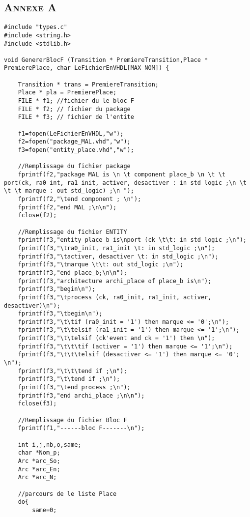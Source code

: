 \begin{appendices}
\chapter*{\textsc{Annexe A}}
	
	\begin{lstlisting}	
#include "types.c"
#include <string.h>
#include <stdlib.h>

void GenererBlocF (Transition * PremiereTransition,Place * PremierePlace, char LeFichierEnVHDL[MAX_NOM]) {

	Transition * trans = PremiereTransition;
   	Place * pla = PremierePlace;
	FILE * f1; //fichier du le bloc F
	FILE * f2; // fichier du package
	FILE * f3; // fichier de l'entite
	
	f1=fopen(LeFichierEnVHDL,"w");
	f2=fopen("package_MAL.vhd","w");
	f3=fopen("entity_place.vhd","w");
	
	//Remplissage du fichier package	
	fprintf(f2,"package MAL is \n \t component place_b \n \t \t port(ck, ra0_int, ra1_init, activer, desactiver : in std_logic ;\n \t \t \t marque : out std_logic) ;\n ");
	fprintf(f2,"\tend component ; \n");
	fprintf(f2,"end MAL ;\n\n");
	fclose(f2);
		
	//Remplissage du fichier ENTITY
	fprintf(f3,"entity place_b is\nport (ck \t\t: in std_logic ;\n");
	fprintf(f3,"\tra0_init, ra1_init \t: in std_logic ;\n");
	fprintf(f3,"\tactiver, desactiver \t: in std_logic ;\n");
	fprintf(f3,"\tmarque \t\t: out std_logic ;\n");
	fprintf(f3,"end place_b;\n\n");
	fprintf(f3,"architecture archi_place of place_b is\n");
	fprintf(f3,"begin\n");
	fprintf(f3,"\tprocess (ck, ra0_init, ra1_init, activer, desactiver)\n");
	fprintf(f3,"\tbegin\n");
	fprintf(f3,"\t\tif (ra0_init = '1') then marque <= '0';\n");
	fprintf(f3,"\t\telsif (ra1_init = '1') then marque <= '1';\n");
	fprintf(f3,"\t\telsif (ck'event and ck = '1') then \n");
	fprintf(f3,"\t\t\tif (activer = '1') then marque <= '1';\n");
	fprintf(f3,"\t\t\telsif (desactiver <= '1') then marque <= '0'; \n");
	fprintf(f3,"\t\t\tend if ;\n");
	fprintf(f3,"\t\tend if ;\n");
	fprintf(f3,"\tend process ;\n");
	fprintf(f3,"end archi_place ;\n\n");
	fclose(f3);

	//Remplissage du fichier Bloc F
	fprintf(f1,"------bloc F-------\n");

	int i,j,nb,o,same;	
	char *Nom_p;
	Arc *arc_So;
	Arc *arc_En;
	Arc *arc_N;

	//parcours de le liste Place
	do{  
		same=0;
	

\end{lstlisting}
\end{appendices}
